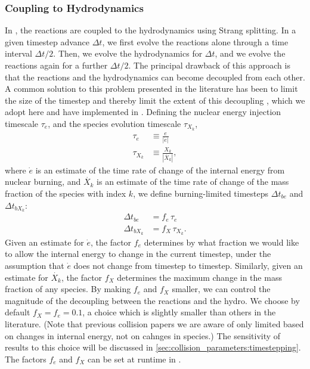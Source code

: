 \documentclass[12pt]{article}
\begin{document}
\subsubsection{Coupling to Hydrodynamics}
\label{sec:burnerhydrocoupling}

In \castro, the reactions are coupled to the hydrodynamics using Strang splitting.
In a given timestep advance $\Delta t$, we first evolve the reactions alone through
a time interval $\Delta t / 2$. Then, we evolve the hydrodynamics for $\Delta t$,
and we evolve the reactions again for a further $\Delta t / 2$. The principal
drawback of this approach is that the reactions and the hydrodynamics can become
decoupled from each other. A common solution to this problem presented in
the literature has been to limit the size of the timestep and thereby limit the
extent of this decoupling \citep{raskin:2010,hawley:2012}, which we adopt here 
and have implemented in \castro. Defining the nuclear energy injection timescale 
$\tau_e$, and the species evolution timescale $\tau_{X_k}$,
\begin{align}
  \tau_e &\equiv \frac{e}{|\dot{e}|} \\
  \tau_{X_k} &\equiv \frac{X_k}{|\dot{X_k}|},
\end{align}
where $\dot{e}$ is an estimate of the time rate of change of the internal energy
from nuclear burning, and $\dot{X_k}$ is an estimate of the time rate of change 
of the mass fraction of the species with index $k$, we define burning-limited 
timesteps $\Delta t_{be}$ and $\Delta t_{bX_k}$:
\begin{align}
  \Delta t_{be} &= f_{e}\, \tau_e \label{eq:timestep_e}\\
  \Delta t_{bX_k} &= f_{X}\, \tau_{X_k}. \label{eq:timestep_X}
\end{align}
Given an estimate for $\dot{e}$, the factor $f_{e}$ determines by what 
fraction we would like to allow the internal energy to change
in the current timestep, under the assumption that $\dot{e}$ does not change from
timestep to timestep. Similarly, given an estimate for $\dot{X_k}$, the factor $f_{X}$ 
determines the maximum change in the mass fraction of any species. By making 
$f_{e}$ and $f_{X}$ smaller, we can control the magnitude of the decoupling 
between the reactions and the hydro. We choose by default $f_{X} = f_{e} = 0.1$, 
a choice which is slightly smaller than others in the literature. (Note that previous 
collision papers we are aware of only limited based on changes in internal energy, 
not on cahnges in species.)  The sensitivity of results to this choice will be discussed in 
\autoref{sec:collision_parameters:timestepping}. The factors $f_{e}$ and $f_{X}$ can be set at runtime in \castro.
\end{document}

